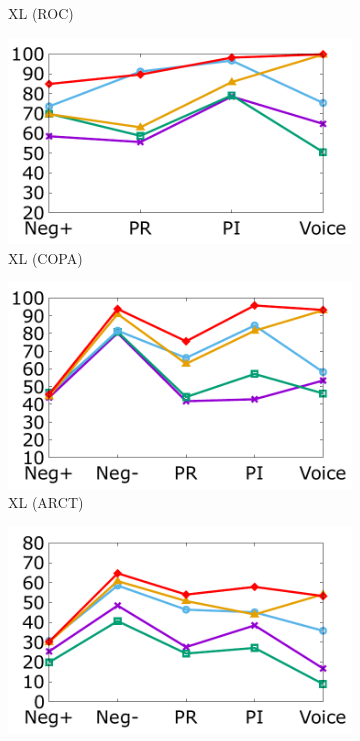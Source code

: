 \begin{figure}[!th]
\begin{subfigure}[b]{0.23\textwidth}
\caption{XL (ROC)}
\label{fig:roc_xlnet}
\end{subfigure}
\hfill
\begin{subfigure}[b]{0.23\textwidth}
\centering
\includegraphics[width=\columnwidth]{data/copa_xlnet.pdf}
\caption{XL (COPA)}
\label{fig:copa_xlnet}
\end{subfigure}
\hfill
\begin{subfigure}[b]{0.23\textwidth}
\centering
\includegraphics[width=\columnwidth]{data/arct_xlnet.pdf}
\caption{XL (ARCT)}
\label{fig:arct_xlnet}
\end{subfigure}
\hfill
\begin{subfigure}[b]{0.23\textwidth}
\centering
\includegraphics[width=\columnwidth]{data/reclor_xlnet.pdf}

\end{subfigure}
\end{figure}
